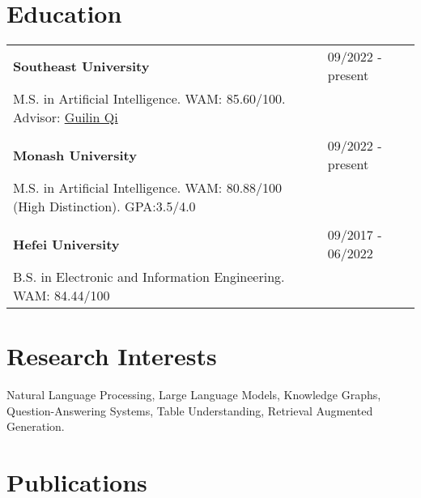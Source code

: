 \documentclass[a4paper,12pt]{article}
\begin{document}
\section{Education}
\begin{tabularx}{\linewidth}{@{}l X@{}}	

\textbf{Southeast University } & \hfill 09/2022 - present \\
M.S. in Artificial Intelligence. WAM: 85.60/100. Advisor: \href{https://scholar.google.com/citations?user=1gw3LJQAAAAJ\&hl=en}{Guilin Qi} \\
\\
\textbf{Monash University } & \hfill 09/2022 - present \\
M.S. in Artificial Intelligence. WAM: 80.88/100 (High Distinction). GPA:3.5/4.0 \\
\\
\textbf{Hefei University} & \hfill 09/2017 - 06/2022 \\
B.S. in Electronic and Information Engineering. WAM: 84.44/100\\




\end{tabularx}

\section{Research Interests}
Natural Language Processing, Large Language Models, Knowledge Graphs, Question-Answering Systems, Table Understanding, Retrieval Augmented Generation.

\section{Publications}
\end{document}
